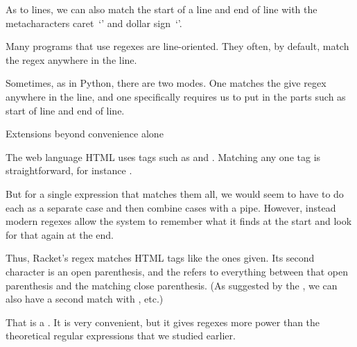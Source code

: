 \documentclass[9pt,t,serif,professionalfont,xcolor={table,dvipsnames},noamsthm]{beamer}
\begin{document}
\begin{frame}
As to lines,
we can also match the start of a line and end of line with the metacharacters
caret~`\str{\textasciicircum}' and
dollar sign~`\str{\textdollar}'.

Many programs that use regexes are line-oriented.
They often, by default, match the regex anywhere in the line.

Sometimes, as in Python, there are two modes.
One matches the give regex anywhere in the line, and one
specifically requires us to put in the parts such as start of line
and end of line.
\end{frame}



\begin{frame}{Extensions beyond convenience alone}
\begin{example}
The web language HTML uses tags such as
 and .
Matching any one tag is straightforward, for instance
.

But for a single expression that matches them all,
we would seem to have to do each as a separate
case and then combine cases with a pipe.
However, instead modern regexes allow the system to remember what it finds
at the start and look for that again at the end.

Thus, Racket's regex
matches HTML tags like the ones given.
Its second character is an open parenthesis, and the
 refers to everything between that
open parenthesis and the
matching close parenthesis.
(As suggested by the , we can also have
a second match with , 
etc.)
\end{example}

That is a .
It is very convenient, but
it gives regexes
more power than the theoretical regular expressions that we studied earlier.
\end{frame}
\end{document}
